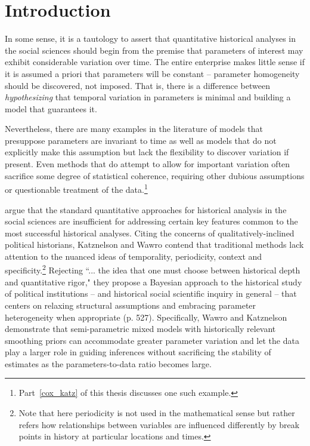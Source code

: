 \chapter{Introduction}
\label{introduction}

In some sense, it is a tautology to assert that quantitative historical analyses in the social sciences should begin from the premise that parameters of interest may exhibit considerable variation over time. The entire enterprise makes little sense if it is assumed a priori that parameters will be constant -- parameter homogeneity should be discovered, not imposed. That is, there is a difference between {\it hypothesizing} that temporal variation in parameters is minimal and building a model that guarantees it. 

Nevertheless, there are many examples in the literature of models that presuppose parameters are invariant to time as well as models that do not explicitly make this assumption but lack the flexibility to discover variation if present.  Even methods that do attempt to allow for important variation often sacrifice some degree of statistical coherence, requiring other dubious assumptions or questionable treatment of the data.\footnote{Part~\ref{cox_katz} of this thesis discusses one such example.}

 argue that the standard quantitative approaches for historical analysis in the social sciences are insufficient for addressing certain key features common to the most successful historical analyses. Citing the concerns of qualitatively-inclined political historians, Katznelson and Wawro contend that traditional methods lack attention to the nuanced ideas of temporality, periodicity, context and specificity.\footnote{Note that here periodicity is not used in the mathematical sense but rather refers how relationships between variables are influenced differently by break points in history at particular locations and times.}  Rejecting ``... the idea that one must choose between historical depth and quantitative rigor," they propose a Bayesian approach to the historical study of political institutions -- and historical social scientific inquiry in general --  that centers on relaxing structural assumptions and embracing  parameter heterogeneity when appropriate (p. 527). Specifically, Wawro and Katznelson demonstrate that semi-parametric mixed models with historically relevant smoothing priors can accommodate greater parameter variation and let the data play a larger role in guiding inferences without sacrificing the stability of estimates as the parameters-to-data ratio becomes large.  

